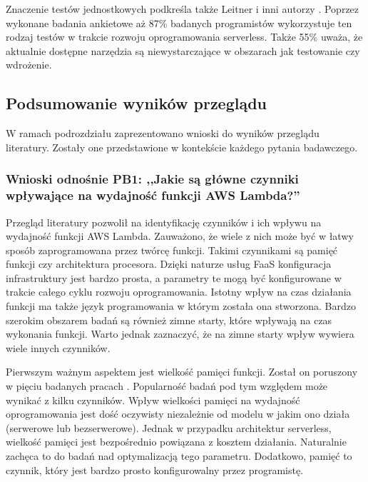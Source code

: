 Znaczenie testów jednostkowych podkreśla także Leitner i inni autorzy \cite{LEITNER2019340}.
Poprzez wykonane badania ankietowe aż 87\% badanych programistów wykorzystuje ten rodzaj testów w trakcie rozwoju oprogramowania serverless.
Także 55\% uważa, że aktualnie dostępne narzędzia są niewystarczające w obszarach jak testowanie czy wdrożenie.

\subsection{Podsumowanie wyników przeglądu}\label{chapter:przeglad_literatury_wyniki_podsumowanie}

W ramach podrozdziału zaprezentowano wnioski do wyników przeglądu literatury. 
Zostały one przedstawione w kontekście każdego pytania badawczego.

\subsubsection*{Wnioski odnośnie PB1: ,,Jakie są główne czynniki wpływające na wydajność funkcji AWS Lambda?''}

Przegląd literatury pozwolił na identyfikację czynników i ich wpływu na wydajność funkcji AWS Lambda.
Zauważono, że wiele z nich może być w łatwy sposób zaprogramowana przez twórcę funkcji.
Takimi czynnikami są pamięć funkcji czy architektura procesora.
Dzięki naturze usług FaaS konfiguracja infrastruktury jest bardzo prosta, a parametry te mogą być konfigurowane w trakcie całego cyklu rozwoju oprogramowania.
Istotny wpływ na czas działania funkcji ma także język programowania w którym została ona stworzona.
Bardzo szerokim obszarem badań są również zimne starty, które wpływają na czas wykonania funkcji.
Warto jednak zaznaczyć, że na zimne starty wpływ wywiera wiele innych czynników.

Pierwszym ważnym aspektem jest wielkość pamięci funkcji. 
Został on poruszony w pięciu badanych pracach \cite{9284261}\cite{9235063}\cite{8567674}\cite{pawlik2019performanceconsiderationsexecutionlarge}\cite{9946331}.
Popularność badań pod tym względem może wynikać z kilku czynników. 
Wpływ wielkości pamięci na wydajność oprogramowania jest dość oczywisty niezależnie od modelu w jakim ono działa (serwerowe lub bezserwerowe).
Jednak w przypadku architektur serverless, wielkość pamięci jest bezpośrednio powiązana z kosztem działania.
Naturalnie zachęca to do badań nad optymalizacją tego parametru.
Dodatkowo, pamięć to czynnik, który jest bardzo prosto konfigurowalny przez programistę.

